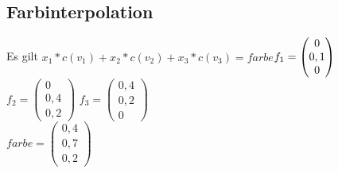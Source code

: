 \documentclass[10pt,a4paper]{article}
\begin{document}
\subsection{Farbinterpolation}

Es gilt $x_1*c(v_1)+x_2*c(v_2)+x_3*c(v_3) = farbe$$
\\f_1 =\begin{pmatrix}
0 \\
0,1 \\
0
\end{pmatrix}
$ $
f_2 =\begin{pmatrix}
0 \\
0,4 \\
 0,2
\end{pmatrix}
$ 
$
f_3 =\begin{pmatrix}
0,4  \\
0,2\\
0
\end{pmatrix}
$
\\
$
farbe =\begin{pmatrix}
0,4 \\
0,7\\
 0,2
\end{pmatrix}
$ 
\end{document}
